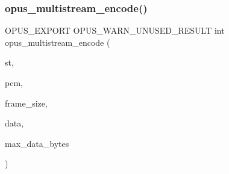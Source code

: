 \subsubsection{\texorpdfstring{opus\+\_\+multistream\+\_\+encode()}{opus\_multistream\_encode()}}
{\footnotesize\ttfamily O\+P\+U\+S\+\_\+\+E\+X\+P\+O\+RT O\+P\+U\+S\+\_\+\+W\+A\+R\+N\+\_\+\+U\+N\+U\+S\+E\+D\+\_\+\+R\+E\+S\+U\+LT int opus\+\_\+multistream\+\_\+encode (\begin{DoxyParamCaption}\item[{\hyperlink{group__opus__multistream_gae5826674d142fc873ebc1d781c507dd7}{Opus\+M\+S\+Encoder} $\ast$}]{st,  }\item[{\hyperlink{zconf_8h_a2c212835823e3c54a8ab6d95c652660e}{const} \hyperlink{opus__types_8h_acc9ed7cf60479eb81f9648c6ec27dc26}{opus\+\_\+int16} $\ast$}]{pcm,  }\item[{int}]{frame\+\_\+size,  }\item[{unsigned char $\ast$}]{data,  }\item[{\hyperlink{opus__types_8h_aa4d309d6f80b99dbabebc8f98879ab9a}{opus\+\_\+int32}}]{max\+\_\+data\+\_\+bytes }\end{DoxyParamCaption})}


